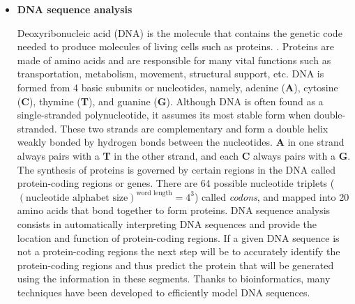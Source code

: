 \documentclass[10pt,twocolumn,letterpaper]{article}
\begin{document}
{\begin{itemize}
      \item \textbf{DNA sequence analysis}
      \par Deoxyribonucleic acid (DNA) is the molecule that contains the genetic code needed to produce molecules of living cells such as
       proteins. \cite{krawetz2003introduction}. Proteins are made of amino acids and are responsible for many vital functions such as
        transportation, metabolism, movement, structural support, etc. DNA is formed from 4 basic subunits or nucleotides, namely, adenine
        (\textbf{A}), cytosine (\textbf{C}), thymine (\textbf{T}), and guanine (\textbf{G}). \cite{chakravarthy2004autoregressive} Although
         DNA is often found as a single-stranded polynucleotide, it assumes its most stable form when double-stranded. These two strands are complementary
          and form a double helix weakly bonded by hydrogen bonds between the nucleotides. \textbf{A} in one strand always pairs with a \textbf{T} in
           the other strand, and each \textbf{C} always pairs with a \textbf{G}. The synthesis of proteins is governed by certain regions in the DNA called protein-coding regions or genes.
            There are 64 possible nucleotide triplets (\((\text{nucleotide alphabet size})^{\text{word length}} = 4^3 \)) called \textit{codons}, and mapped into 20 amino acids
             that bond together to form proteins. DNA sequence analysis consists in automatically interpreting DNA sequences and provide the location and function of protein-coding regions.
              If a given DNA sequence is not a protein-coding regions the next step will be to accurately identify the protein-coding regions and thus predict the protein that will be generated
               using the information in these segments. \cite{chakravarthy2004autoregressive} Thanks to bioinformatics, many techniques have been developed to efficiently model DNA sequences.
   

\end{itemize}}
\end{document}
